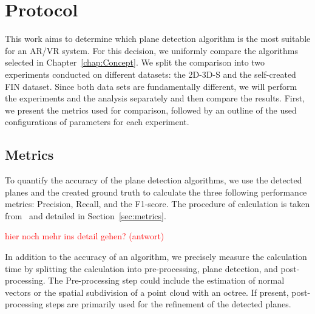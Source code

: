 \documentclass[main.tex]{subfiles}
\begin{document}
\section{Protocol}
This work aims to determine which plane detection algorithm is the most suitable for an AR/VR system. For this decision, we uniformly compare the algorithms selected in
Chapter~\ref{chap:Concept}. We split the comparison into two experiments conducted on different datasets: the 2D-3D-S and the
self-created FIN dataset. Since both data sets are fundamentally different, we will perform the experiments and the analysis separately and then compare the results.
First, we present the metrics used for comparison, followed by an outline of the used configurations of parameters for each experiment.

\subsection{Metrics}
To quantify the accuracy of the plane detection algorithms, we use the detected planes and the created ground truth to calculate the three following
performance metrics: Precision, Recall, and the F1-score. The procedure of calculation is taken from~\cite[Section~4]{Araújo_Oliveira_2020} and detailed
in Section~\ref{sec:metrics}.

\textcolor{red}{hier noch mehr ins detail gehen? (antwort) \underline{\hspace{2cm}}}

In addition to the accuracy of an algorithm, we precisely measure the calculation time by splitting the calculation into pre-processing, plane
detection, and post-processing. The Pre-processing step could include the estimation of normal vectors or the spatial subdivision
of a point cloud with an octree. If present, post-processing steps are primarily used for the refinement of the detected planes.
\end{document}
